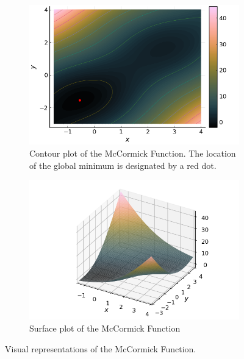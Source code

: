   \begin{figure}[ht!]
    \centering
    \begin{subfigure}[b]{0.45\textwidth}
      \centering
      \includegraphics[width=\textwidth]
        {img/test_functions/mccormick_contour.png}
      \caption{
        Contour plot of the McCormick Function.
        The location of the global minimum is designated by a red dot.
      }
    \end{subfigure}
    \hfill
    \begin{subfigure}[b]{0.45\textwidth}
      \centering
      \includegraphics[width=\textwidth]
        {img/test_functions/mccormick_surface.png}
      \caption{Surface plot of the McCormick Function}
    \end{subfigure}
    \caption{Visual representations of the McCormick Function.}
    \label{fig:app:test:mccormick}
  \end{figure}